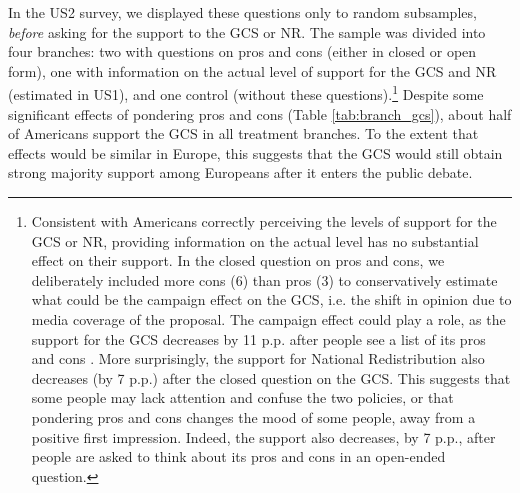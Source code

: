 In the US2 survey, we displayed these questions only to random subsamples, \textit{before} asking for the support to the GCS or NR. The sample was divided into four branches: two with questions on pros and cons (either in closed or open form), one with information on the actual level of support for the GCS and NR (estimated in US1), and one control (without these questions).\footnote{Consistent with Americans correctly perceiving the levels of support for the GCS or NR, providing information on the actual level has no substantial effect on their support. In the closed question on pros and cons, we deliberately included more cons (6) than pros (3) to conservatively estimate what could be the campaign effect on the GCS, i.e. the shift in opinion due to media coverage of the proposal. The campaign effect could play a role, as the support for the GCS decreases by 11 p.p. after people see a list of its pros and cons%
. More surprisingly, the support for National Redistribution also decreases (by 7 p.p.) after the closed question on the GCS. This suggests that some people may lack attention and confuse the two policies, or that pondering pros and cons changes the mood of some people, away from a positive first impression. Indeed, the support also decreases, by 7 p.p., after people are asked to think about its pros and cons in an open-ended question.} Despite some significant effects of pondering pros and cons (Table \ref{tab:branch_gcs}), about half of Americans support the GCS in all treatment branches. To the extent that effects would be similar in Europe, this suggests that the GCS would still obtain strong majority support among Europeans after it enters the public debate. 



